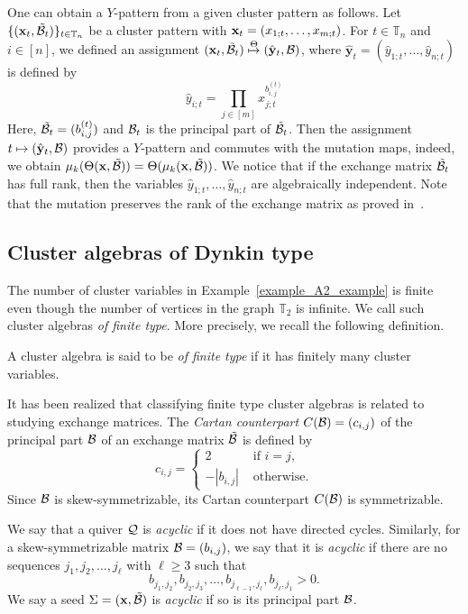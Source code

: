 \begin{remark}\label{rmk_x_cluster_mutation}
One can obtain a $Y$-pattern from a given cluster pattern as follows.
Let $\{ (\mathbf{x}_t, \mathcal{\tilde{B}}_t)\}_{t \in \mathbb{T}_n}$ be a cluster
pattern with $\mathbf{x}_t = (x_{1;t},\dots,x_{m;t})$. For $t \in \mathbb{T}_n$ and
$i \in [n]$, we defined an assignment $(\mathbf x_t, \mathcal{\tilde{B}}_t) \stackrel{\Theta}{\mapsto} (\hat{\mathbf y}_t,\mathcal{B})$, where $\hat{\mathbf y}_t= (\hat{y}_{1;t},\dots,\hat{y}_{n;t})$ is defined by 
\[
    \hat{y}_{i;t} = \prod_{j\in[m] } x_{j;t}^{b^{(t)}_{i,j}}
\]
Here, $\mathcal{\tilde{B}}_t = (b^{(t)}_{i,j})$ and $\mathcal{B}_t$ is the principal part of $\mathcal{\tilde{B}}_t$.
Then the assignment $t \mapsto (\hat{\mathbf y}_t, \mathcal{B})$ provides a 
$Y$-pattern and commutes with the mutation maps, indeed, we obtain $\mu_k(\Theta(\mathbf x, \mathcal{\tilde{B}})) = \Theta(\mu_k(\mathbf x,\mathcal{\tilde{B}}))$. 
We notice that if the exchange matrix $\mathcal{\tilde{B}}_t$ has full rank, then the variables $\hat{y}_{1;t},\dots,\hat{y}_{n;t}$ are algebraically independent. 
Note that the mutation preserves the rank of the exchange matrix as proved in~\cite[Lemma~3.2]{BFZ3_2005}.
\end{remark}


\subsection{Cluster algebras of Dynkin type}
The number of cluster variables in Example~\ref{example_A2_example} is finite
even though the number of vertices in the graph $\mathbb{T}_2$ is infinite.
We call such cluster algebras \emph{of finite type}. More precisely, we
recall the following definition.
\begin{definition}[{\cite{FZ2_2003}}]
	A cluster algebra is said to be \emph{of finite type} if it has finitely
	many cluster variables.
\end{definition}
It has been realized that classifying finite type cluster algebras is related
to studying exchange matrices. The \emph{Cartan counterpart}
$C(\mathcal{B}) = (c_{i,j})$ of the principal part
$\mathcal{B}$ of an exchange matrix $\mathcal{\tilde{B}}$ is defined by
\[
c_{i,j} = \begin{cases}
2 & \text{ if } i = j, \\
-|b_{i,j}| & \text{ otherwise}.
\end{cases}
\]
Since $\mathcal{B}$ is skew-symmetrizable, its Cartan
counterpart $C(\mathcal{B})$ is symmetrizable. 

We say that a quiver $\mathcal{Q}$ is \emph{acyclic} if it does not have directed cycles.
Similarly, for a skew-symmetrizable matrix $\mathcal{B} = (b_{i,j})$, we say that it is \emph{acyclic} if there are no sequences $j_1,j_2,\dots,j_{\ell}$ with $\ell \ge 3$ such that
\[
b_{j_1,j_2}, b_{j_2,j_3},\dots,b_{j_{\ell-1},j_{\ell}},b_{j_{\ell},j_1} > 0.
\]
We say a seed $\Sigma = (\mathbf x, \mathcal{\tilde{B}})$ is \emph{acyclic} if so is its principal part $\mathcal{B}$.

